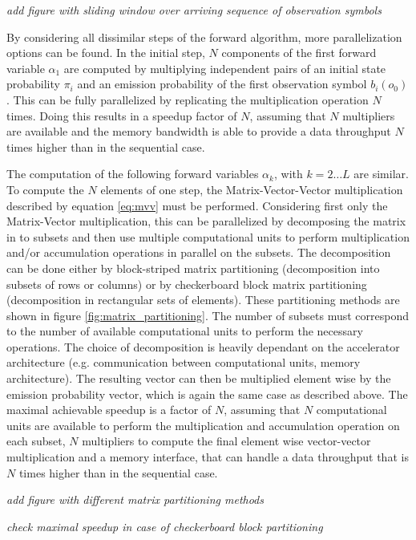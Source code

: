 \documentclass[mscthesis]{usiinfthesis}
\begin{document}
\emph{\color{red}add figure with sliding window over arriving sequence of
    observation symbols}

By considering all dissimilar steps of the forward algorithm, more parallelization
options can be found. In the initial step, $ N $ components of the first forward
variable $ \alpha_1 $ are computed by multiplying independent pairs of an initial
state probability $ \pi_i $ and an emission probability of the first observation
symbol $ b_i(o_0) $. This can be fully parallelized by replicating the
multiplication operation $ N $ times. Doing this results in a speedup factor of
$ N $, assuming that $ N $ multipliers are available and the memory bandwidth
is able to provide a data throughput $ N $ times higher than in the sequential
case.

The computation of the following forward variables $ \alpha_k $, with
$ k = 2 \dots L $ are similar. To compute the $ N $ elements of one step, the
Matrix-Vector-Vector multiplication described by equation \ref{eq:mvv} must
be performed. Considering first only the Matrix-Vector multiplication, this can
be parallelized by decomposing the matrix in to subsets and then use multiple
computational units to perform multiplication and/or accumulation operations in
parallel on the subsets. The decomposition can be done either by block-striped
matrix partitioning (decomposition into subsets of rows or columns) or by
checkerboard block matrix partitioning (decomposition in rectangular sets of
elements). These partitioning methods are shown in figure
\ref{fig:matrix_partitioning}. The number of subsets must correspond to the
number of available computational units to perform the necessary operations.
The choice of decomposition is heavily dependant on the accelerator
architecture (e.g.  communication between computational units, memory
architecture). The resulting vector can then be multiplied element wise by the
emission probability vector, which is again the same case as described above.
The maximal achievable speedup is a factor of $ N $, assuming that
$ N $ computational units are available to perform the multiplication and
accumulation operation on each subset, $ N $ multipliers to compute the final
element wise vector-vector multiplication and a memory interface, that can
handle a data throughput that is $ N $ times higher than in the sequential
case.

\emph{\color{red}add figure with different matrix partitioning methods}

\emph{\color{red}check maximal speedup in case of checkerboard block
partitioning}
\end{document}
